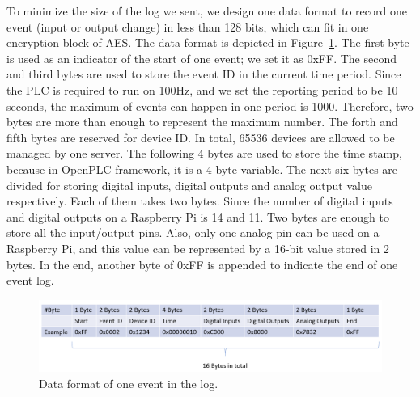 To minimize the size of the log we sent, we design one data format to record one event (input or output change) in less than 128 bits, which can fit in one encryption block of AES. The data format is depicted in Figure~\ref{fig:data_format}. The first byte is used as an indicator of the start of one event; we set it as 0xFF. The second and third bytes are used to store the event ID in the current time period. Since the PLC is required to run on 100Hz, and we set the reporting period to be 10 seconds, the maximum of events can happen in one period is 1000. Therefore, two bytes are more than enough to represent the maximum number. The forth and fifth bytes are reserved for device ID. In total, 65536 devices are allowed to be managed by one server. The following 4 bytes are used to store the time stamp, because in OpenPLC framework, it is a 4 byte variable. The next six bytes are divided for storing digital inputs, digital outputs and analog output value respectively. Each of them takes two bytes. Since the number of digital inputs and digital outputs on a Raspberry Pi is 14 and 11. Two bytes are enough to store all the input/output pins. Also, only one analog pin can be used on a Raspberry Pi, and this value can be represented by a 16-bit value stored in 2 bytes. In the end, another byte of 0xFF is appended to indicate the end of one event log. 

\begin{figure}[h]
  \centering
    \includegraphics[width=\textwidth]{figs/data_format}
    \caption{Data format of one event in the log.}
    \label{fig:data_format}
\end{figure}
